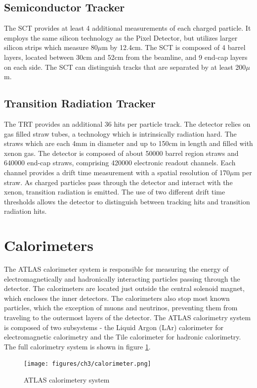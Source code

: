 \subsection{Semiconductor Tracker}
The SCT provides at least 4 additional measurements of each charged particle. It employs the same silicon technology as the Pixel Detector, but utilizes larger silicon strips which measure 80$\mu$m by 12.4cm. The SCT is composed of 4 barrel layers, located between 30cm and 52cm from the beamline, and 9 end-cap layers on each side. The SCT can distinguish tracks that are separated by at least 200$\mu$m.

\subsection{Transition Radiation Tracker}
The TRT provides an additional 36 hits per particle track. The detector relies on gas filled straw tubes, a technology which is intrinsically radiation hard. The straws which are each 4mm in diameter and up to 150cm in length and filled with xenon gas. The detector is composed of about 50000 barrel region straws and 640000 end-cap straws, comprising 420000 electronic readout channels. Each channel provides a drift time measurement with a spatial resolution of 170$\mu$m per straw. As charged particles pass through the detector and interact with the xenon, transition radiation is emitted. The use of two different drift time thresholds allows the detector to distinguish between tracking hits and transition radiation hits. 

\section{Calorimeters}
The ATLAS calorimeter system is responsible for measuring the energy of electromagnetically and hadronically interacting particles passing through the detector. The calorimeters are located just outside the central solenoid magnet, which encloses the inner detectors. The calorimeters also stop most known particles, which the exception of muons and neutrinos, preventing them from traveling to the outermost layers of the detector. The ATLAS calorimetry system is composed of two subsystems - the Liquid Argon (LAr) calorimeter for electromagnetic calorimetry and the Tile calorimeter for hadronic calorimetry. The full calorimetry system is shown in figure \ref{fig:calorimeters}.

\begin{figure}
        \centering
	\texttt{[image: figures/ch3/calorimeter.png]}
	\caption{ATLAS calorimetery system \cite{calorimeter_img}}
	\label{fig:calorimeters}
\end{figure}

